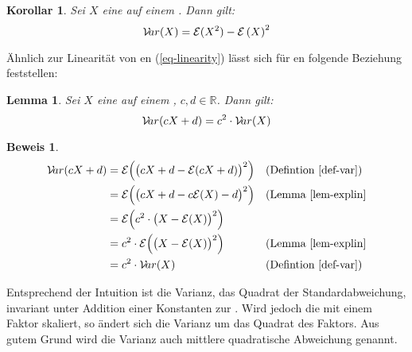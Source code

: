\documentclass[a4paper]{article}
\newtheorem{korollar}[satz]{Korollar}
\newtheorem{lemma}[satz]{Lemma}
\theoremstyle{nonumberplain}
\newtheorem{beweis}{Beweis}
\begin{document}
\begin{korollar}\label{kor-var-exp}
	Sei $X$ eine \rvar{} auf einem \probspace{}. Dann gilt:
	\begin{equation}
		\mathcal{V}\!ar(X) = \mathcal{E}(X^{2}) - \mathcal{E}\left(X\right)^{2}
	\end{equation}
\end{korollar}
Ähnlich zur Linearität von \expect{}en (\ref{eq-linearity}) lässt sich für \var{}en folgende Beziehung feststellen:
\begin{lemma}\label{lemma-var-qlinear}
	Sei $X$ eine \rvar{} auf einem \probspace{}, $c,d \in \mathbb{R}$. Dann gilt:
	\begin{equation}
		\mathcal{V}\!ar(cX + d) = c^2\cdot\mathcal{V}\!ar(X)
	\end{equation}
\end{lemma}
\begin{beweis}
\begin{align*}
\mathcal{V}\!ar(cX + d) & = \mathcal{E}\Big(\big(cX + d - \mathcal{E}(cX + d)\big)^2\Big) && \text{(Defintion \ref{def-var})} \\
& = \mathcal{E}\Big(\big(cX + d - c\mathcal{E}(X) - d\big)^2\Big) && \text{(Lemma \ref{lem-explin}}\\
& = \mathcal{E}\Big(c^2 \cdot \big(X - \mathcal{E}(X) \big)^2\Big)\\
& = c^2 \cdot \mathcal{E}\Big( \big(X - \mathcal{E}(X) \big)^2\Big) && \text{(Lemma \ref{lem-explin}}\\
& = c^2 \cdot \mathcal{V}\!ar(X) && \text{(Defintion \ref{def-var})}
\end{align*}
\end{beweis}
Entsprechend der Intuition ist die Varianz, das Quadrat der Standardabweichung, invariant unter Addition einer Konstanten zur \rvar{}. Wird jedoch die \rvar{} mit einem Faktor skaliert, so ändert sich die Varianz um das Quadrat des Faktors. Aus gutem Grund wird die Varianz auch mittlere quadratische Abweichung genannt.
\end{document}
